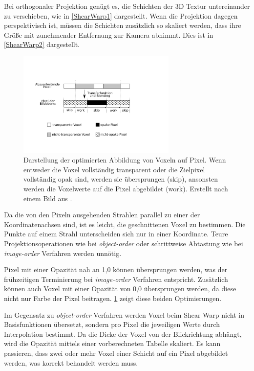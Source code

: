 \documentclass[a4paper,fontsize=12pt,toc=bib,parskip=half,ngerman]{scrartcl}
\begin{document}
Bei orthogonaler Projektion gen\"ugt es, die Schichten der 3D Textur untereinander zu verschieben, wie in \cref{ShearWarp1} dargestellt. Wenn die Projektion dagegen perspektivisch ist, m\"ussen die Schichten zus\"atzlich so skaliert werden, dass ihre Gr\"o{\ss}e mit zunehmender Entfernung zur Kamera abnimmt. Dies ist in \cref{ShearWarp2} dargestellt.


\begin{figure}
	\centering
	\includegraphics[width=0.7\textwidth]{pictures/Scanline.png}
	\caption{Darstellung der optimierten Abbildung von Voxeln auf Pixel. Wenn entweder die Voxel vollst\"andig transparent oder die Zielpixel vollst\"andig opak sind, werden sie \"ubersprungen (\glq skip\grq{}), ansonsten werden die Voxelwerte auf die Pixel abgebildet (\glq work\grq{}). Erstellt nach einem Bild aus \cite{lacroute1994fast}.}
	\label{Scanline}
\end{figure}

Da die von den Pixeln ausgehenden Strahlen parallel zu einer der Koordinatenachsen sind, ist es leicht, die geschnittenen Voxel zu bestimmen. Die Punkte auf einem Strahl unterscheiden sich nur in einer Koordinate. Teure Projektionsoperationen wie bei \textit{object-order} oder schrittweise Abtastung wie bei \textit{image-order} Verfahren werden unn\"otig.

Pixel mit einer Opazit\"at nah an 1,0 k\"onnen \"ubersprungen werden, was der fr\"uhzeitigen Terminierung bei \textit{image-order} Verfahren entspricht. Zus\"atzlich k\"onnen auch Voxel mit einer Opazit\"at von 0,0 \"ubersprungen werden, da diese nicht nur Farbe der Pixel beitragen. \cref{Scanline} zeigt diese beiden Optimierungen.

Im Gegensatz zu \textit{object-order} Verfahren werden Voxel beim Shear Warp nicht in Basisfunktionen \"ubersetzt, sondern pro Pixel die jeweiligen Werte durch Interpolation bestimmt. Da die Dicke der Voxel von der Blickrichtung abh\"angt, wird die Opazit\"at mittels einer vorberechneten Tabelle skaliert. Es kann passieren, dass zwei oder mehr Voxel einer Schicht auf ein Pixel abgebildet werden, was korrekt behandelt werden muss.
\end{document}
